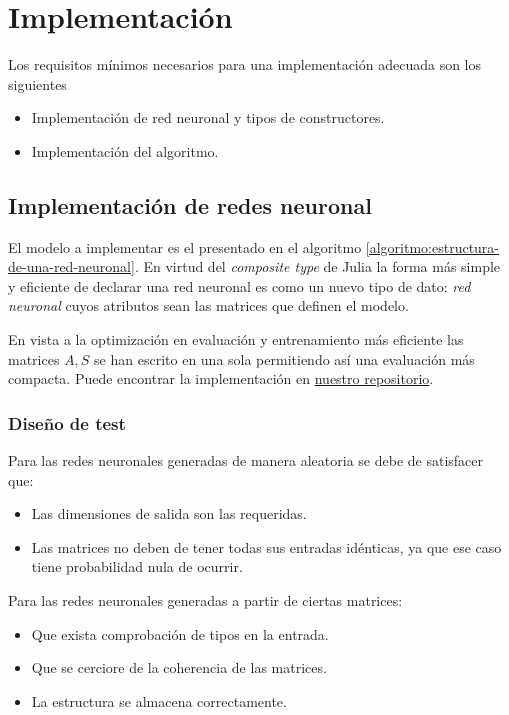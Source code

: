 
\section{Implementación}
\label{ch07:Implementar} 

Los requisitos mínimos necesarios para una implementación adecuada son los siguientes
\begin{itemize}
    \item Implementación de red neuronal y tipos de constructores.
    \item Implementación del algoritmo. 
\end{itemize}

\subsection{Implementación de redes neuronal}

El modelo  a implementar es el presentado en el algoritmo \ref{algoritmo:estructura-de-una-red-neuronal}. En virtud del \textit{composite type} de Julia  la forma más simple y eficiente de 
declarar una red neuronal es como un nuevo tipo de dato: \textit{red neuronal} cuyos atributos sean las matrices que definen el modelo. 

En vista a la optimización en evaluación y 
entrenamiento más eficiente las matrices 
$A, S$ se han escrito en una sola permitiendo así una evaluación más compacta. 
Puede encontrar la implementación 
en \href{https://github.com/BlancaCC/TFG-Estudio-de-las-redes-neuronales/tree/main/Biblioteca-Redes-Neuronales/src}{nuestro repositorio}.
\subsubsection{Diseño de test} 
Para las redes neuronales generadas de manera aleatoria se debe de satisfacer que: 
\begin{itemize}
    \item Las dimensiones de salida son las requeridas.
    \item Las matrices no deben de tener todas sus entradas idénticas, ya que ese caso tiene probabilidad nula de ocurrir. 
\end{itemize}

Para las redes neuronales generadas a partir de 
ciertas matrices: 
\begin{itemize}
    \item Que exista comprobación de tipos en la entrada.
    \item Que se cerciore de la coherencia de las matrices.
    \item  La estructura se almacena correctamente. 
\end{itemize}

